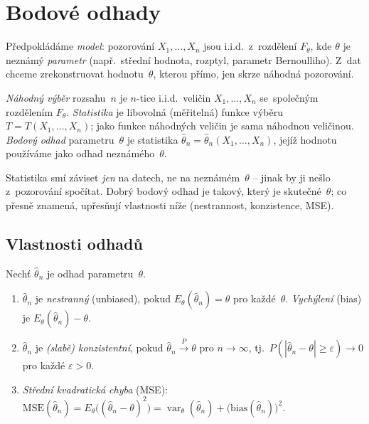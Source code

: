\documentclass[11pt,a4paper]{article}
\DeclareMathOperator{\Var}{var}
\begin{document}
\section{Bodové odhady}

Předpokládáme \emph{model}: pozorování $X_1,\dots,X_n$ jsou i.i.d.\ z~rozdělení $F_\theta$, kde $\theta$ je neznámý \emph{parametr} (např.\ střední hodnota, rozptyl, parametr Bernoulliho). Z~dat chceme zrekonstruovat hodnotu~$\theta$, kterou  přímo, jen skrze náhodná pozorování.

\begin{definice}
\emph{Náhodný výběr} rozsahu~$n$ je $n$-tice i.i.d.\ veličin $X_1,\dots,X_n$ se~společným rozdělením $F_\theta$. \emph{Statistika} je libovolná (měřitelná) funkce výběru $T=T(X_1,\dots,X_n)$; jako funkce náhodných veličin je sama náhodnou veličinou. \emph{Bodový odhad} parametru~$\theta$ je statistika $\hat\theta_n=\hat\theta_n(X_1,\dots,X_n)$, jejíž hodnotu používáme jako odhad neznámého~$\theta$.
\end{definice}

\begin{intuice}
Statistika smí záviset \emph{jen} na datech, ne na neznámém~$\theta$ -- jinak by ji nešlo z~pozorování spočítat. Dobrý bodový odhad je takový, který je  skutečné~$\theta$; co přesně  znamená, upřesňují vlastnosti níže (nestrannost, konzistence, MSE).
\end{intuice}

\subsection{Vlastnosti odhadů}

\begin{definice}
Nechť $\hat\theta_n$ je odhad parametru~$\theta$.
\begin{enumerate}[label=(\arabic*)]
  \item $\hat\theta_n$ je \emph{nestranný} (unbiased), pokud $E_\theta(\hat\theta_n)=\theta$ pro každé~$\theta$. \emph{Vychýlení} (bias) je $E_\theta(\hat\theta_n)-\theta$.
  \item $\hat\theta_n$ je \emph{(slabě) konzistentní}, pokud $\hat\theta_n\xrightarrow{P}\theta$ pro $n\to\infty$, tj.\ $P(|\hat\theta_n-\theta|\ge\varepsilon)\to 0$ pro každé $\varepsilon>0$.
  \item \emph{Střední kvadratická chyba} (MSE): $\mathrm{MSE}(\hat\theta_n)=E_\theta\bigl((\hat\theta_n-\theta)^2\bigr)=\Var_\theta(\hat\theta_n)+\bigl(\mathrm{bias}(\hat\theta_n)\bigr)^2$.
\end{enumerate}
\end{definice}
\end{document}
